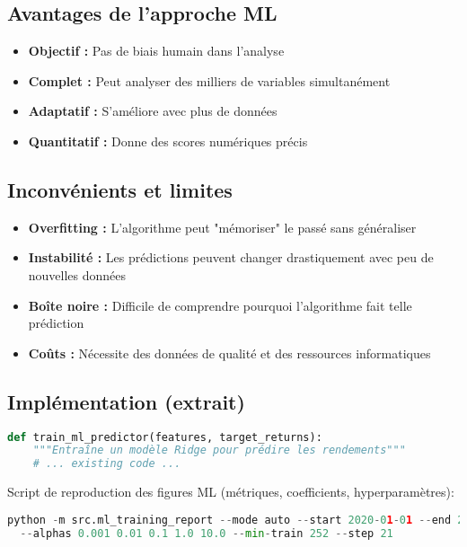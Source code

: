 \documentclass[11pt,a4paper]{article}
\begin{document}
\subsection{Avantages de l'approche ML}
\begin{itemize}
\item \textbf{Objectif :} Pas de biais humain dans l'analyse
\item \textbf{Complet :} Peut analyser des milliers de variables simultanément
\item \textbf{Adaptatif :} S'améliore avec plus de données
\item \textbf{Quantitatif :} Donne des scores numériques précis
\end{itemize}

\subsection{Inconvénients et limites}
\begin{itemize}
\item \textbf{Overfitting :} L'algorithme peut "mémoriser" le passé sans généraliser
\item \textbf{Instabilité :} Les prédictions peuvent changer drastiquement avec peu de nouvelles données
\item \textbf{Boîte noire :} Difficile de comprendre pourquoi l'algorithme fait telle prédiction
\item \textbf{Coûts :} Nécessite des données de qualité et des ressources informatiques
\end{itemize}

\subsection{Implémentation (extrait)}
\begin{lstlisting}[language=Python,caption={ML Ridge - Fichier: \texttt{src/ml\_predictor.py}}]
def train_ml_predictor(features, target_returns):
    """Entraîne un modèle Ridge pour prédire les rendements"""
    # ... existing code ...
\end{lstlisting}
\noindent Script de reproduction des figures ML (métriques, coefficients, hyperparamètres):
\begin{lstlisting}[language=Python,caption={Rapport d'entraînement ML — Fichier: \texttt{src/ml\_training\_report.py}}]
python -m src.ml_training_report --mode auto --start 2020-01-01 --end 2023-12-31 \\
  --alphas 0.001 0.01 0.1 1.0 10.0 --min-train 252 --step 21
\end{lstlisting}
\end{document}
